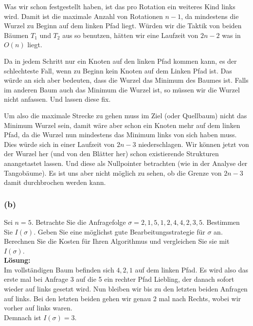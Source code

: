 \documentclass[11pt,a4paper,ngerman]{article}
\begin{document}
Was wir schon festgestellt haben, ist das pro Rotation ein weiteres Kind links wird. Damit ist die maximale Anzahl von Rotationen $n-1$, da mindestens die Wurzel zu Beginn auf dem linken Pfad liegt. Würden wir die Taktik von beiden Bäumen $T_1$ und $T_2$ aus so benutzen, hätten wir eine Laufzeit von $2n-2$ was in $O(n)$ liegt.

Da in jedem Schritt nur ein Knoten auf den linken Pfad kommen kann, es der schlechteste Fall, wenn zu Beginn kein Knoten auf dem Linken Pfad ist. Das würde an sich aber
bedeuten, dass die Wurzel das Minimum des Baumes ist. Falls im anderen Baum auch das Minimum die Wurzel ist, so müssen wir die Wurzel nicht anfassen. Und lassen diese fix.

Um also die maximale Strecke zu gehen muss im Ziel (oder Quellbaum) nicht das Minimum Wurzel sein, damit wäre aber schon ein Knoten mehr auf dem linken Pfad,
da die Wurzel nun mindestens das Minimum links von sich haben muss.\\

Dies würde sich in einer Laufzeit von $2n-3$ niederschlagen. Wir können jetzt von der Wurzel her (und von den Blätter her) schon existierende Strukturen anangetastet lassen. Und diese als Nullpointer betrachten (wie in der Analyse der Tangobäume). Es ist uns aber nicht möglich zu sehen, ob die Grenze von $2n-3$ damit durchbrochen werden kann.

\subsubsection*{(b)}

Sei $n=5$. Betrachte Sie die Anfragefolge $\sigma = 2,1,5,1,2,4,4,2,3,5$. Bestimmen Sie $I(\sigma)$. Geben Sie eine möglichst gute Bearbeitungsstrategie für $\sigma$ an. Berechnen Sie die Kosten für Ihren Algorithmus und vergleichen Sie sie mit $I(\sigma)$.\\

\noindent\textbf{Lösung:}\\

Im vollständigen Baum befinden sich $4,2,1$ auf dem linken Pfad. Es wird also das erste mal bei Anfrage $3$ auf die 5 ein rechter Pfad Liebling, der danach sofort wieder auf links gesetzt wird. Nun bleiben wir bis zu den letzten beiden Anfragen auf links. Bei den letzten beiden gehen wir genau 2 mal nach Rechts, wobei wir vorher auf links waren.\\

Demnach ist $I(\sigma) = 3$.\\
\end{document}
